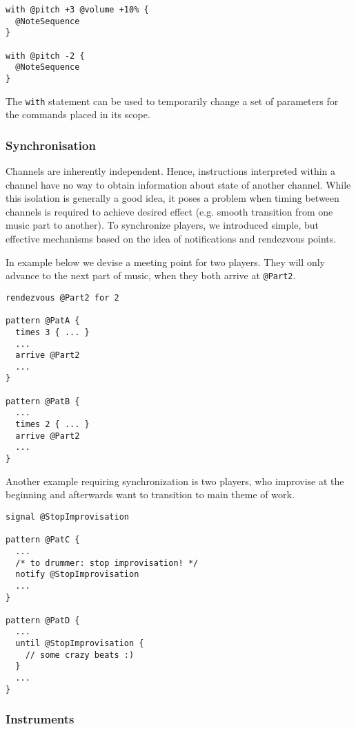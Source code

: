 \documentclass{article}
\begin{document}
\begin{lstlisting}[caption=Temporary parameters modification]
with @pitch +3 @volume +10% {
  @NoteSequence
}

with @pitch -2 {
  @NoteSequence
}
\end{lstlisting}

The {\tt with} statement can be used to temporarily change a set of parameters
for the commands placed in its scope.

\subsubsection{Synchronisation}

Channels are inherently independent. Hence, instructions interpreted within a
channel have no way to obtain information about state of another channel. While
this isolation is generally a good idea, it poses a problem when timing between
channels is required to achieve desired effect (e.g. smooth transition from one
music part to another). To synchronize players, we introduced simple, but
effective mechanisms based on the idea of notifications and rendezvous points.

In example below we devise a meeting point for two players. They will only
advance to the next part of music, when they both arrive at {\tt @Part2}.

\begin{lstlisting}[caption=Use of meeting points for synchronization]
rendezvous @Part2 for 2

pattern @PatA {
  times 3 { ... }
  ...
  arrive @Part2
  ...
}

pattern @PatB {
  ...
  times 2 { ... }
  arrive @Part2
  ...
}
\end{lstlisting}

Another example requiring synchronization is two players, who improvise at the
beginning and afterwards want to transition to main theme of work.

\begin{lstlisting}[caption=Communication through signalling]
signal @StopImprovisation

pattern @PatC {
  ...
  /* to drummer: stop improvisation! */
  notify @StopImprovisation
  ...
}

pattern @PatD {
  ...
  until @StopImprovisation {
    // some crazy beats :)
  }
  ...
}
\end{lstlisting}

\subsubsection{Instruments}
\end{document}
